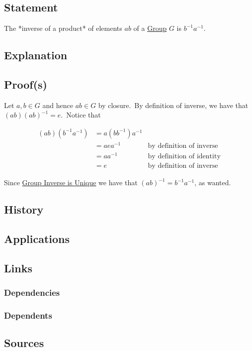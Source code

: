 \subsection{Statement}
The *inverse of a product* of elements $ab$ of a \hyperref[articles:algebra:group-theory:group]{Group} $G$ is $b^{-1} a^{-1}$.

\subsection{Explanation}

\subsection{Proof(s)}
Let $a, b \in G$ and hence $ab \in G$ by closure.\
By definition of inverse, we have that $(ab)(ab)^{-1} = e$.\
Notice that

$$\begin{align*}
(ab)(b^{-1} a^{-1}) &= a(bb^{-1})a^{-1}\\
&= a e a^{-1} & \text{by definition of inverse}\\
&= a a^{-1} & \text{by definition of identity}\\
&= e & \text{by definition of inverse}
\end{align*}$$

Since \hyperref[articles:algebra:group-theory:group-inverse-is-unique]{Group Inverse is Unique} we have that $(ab)^{-1} = b^{-1} a^{-1}$, as wanted.

\subsection{History}

\subsection{Applications}

\subsection{Links}
\subsubsection{Dependencies}
\subsubsection{Dependents}

\subsection{Sources}
